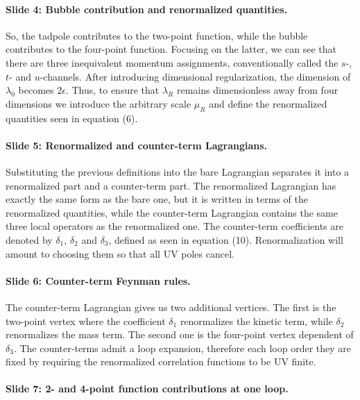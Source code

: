 \documentclass[11pt,a4paper]{article}
\begin{document}
\paragraph{Slide 4: Bubble contribution and renormalized quantities.}

So, the tadpole contributes to the two-point function, while the bubble contributes to the four-point function. Focusing on the latter, we can see that there are three inequivalent momentum assignments, conventionally called the $s$-, $t$- and $u$-channels. After introducing dimensional regularization, the dimension of $\lambda_0$ becomes $2\epsilon$. Thus, to ensure that $\lambda_R$ remains dimensionless away from four dimensions we introduce the arbitrary scale $\mu_R$ and define the renormalized quantities seen in equation (6).

\paragraph{Slide 5: Renormalized and counter-term Lagrangians.}

Substituting the previous definitions into the bare Lagrangian separates it into a renormalized part and a counter-term part. The renormalized Lagrangian has exactly the same form as the bare one, but it is written in terms of the renormalized quantities, while the counter-term Lagrangian contains the same three local operators as the renormalized one. The counter-term coefficients are denoted by $\delta_1$, $\delta_2$ and $\delta_3$, defined as seen in equation (10). Renormalization will amount to choosing them so that all UV poles cancel.

\paragraph{Slide 6: Counter-term Feynman rules.}

The counter-term Lagrangian gives us two additional vertices. The first is the two-point vertex where the coefficient $\delta_1$ renormalizes the kinetic term, while $\delta_2$ renormalizes the mass term. The second one is the four-point vertex dependent of $\delta_3$. The counter-terms admit a loop expansion, therefore each loop order they are fixed by requiring the renormalized correlation functions to be UV finite.

\paragraph{Slide 7: 2- and 4-point function contributions at one loop.}
\end{document}
